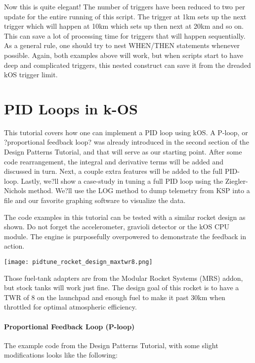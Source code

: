 Now this is quite elegant! The number of triggers have been reduced to two per update for the entire running of this script. The trigger at 1km sets up the next trigger which will happen at 10km which sets up then next at 20km and so on. This can save a lot of processing time for triggers that will happen sequentially. As a general rule, one should try to nest WHEN/THEN statements whenever possible. Again, both examples above will work, but when scripts start to have deep and complicated triggers, this nested construct can save it from the dreaded kOS trigger limit.

	\section{PID Loops in k-OS}%
	
This tutorial covers how one can implement a PID loop using kOS. A P-loop, or ?proportional feedback loop? was already introduced in the second section of the Design Patterns Tutorial, and that will serve as our starting point. After some code rearrangement, the integral and derivative terms will be added and discussed in turn. Next, a couple extra features will be added to the full PID-loop. Lastly, we?ll show a case-study in tuning a full PID loop using the Ziegler-Nichols method. We?ll use the LOG method to dump telemetry from KSP into a file and our favorite graphing software to visualize the data.

The code examples in this tutorial can be tested with a similar rocket design as shown. Do not forget the accelerometer, gravioli detector or the kOS CPU module. The engine is purposefully overpowered to demonstrate the feedback in action.

\begin{center}
\texttt{[image: pidtune\_rocket\_design\_maxtwr8.png]}
\end{center}

Those fuel-tank adapters are from the Modular Rocket Systems (MRS) addon, but stock tanks will work just fine. The design goal of this rocket is to have a TWR of 8 on the launchpad and enough fuel to make it past 30km when throttled for optimal atmospheric efficiency.

\paragraph{Proportional Feedback Loop (P-loop)}
The example code from the Design Patterns Tutorial, with some slight modifications looks like the following:

